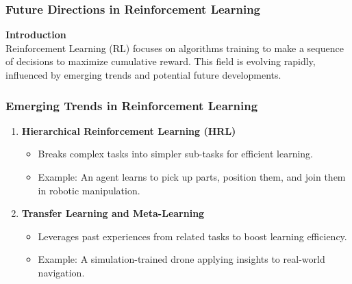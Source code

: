 \documentclass[aspectratio=169]{beamer}
\begin{document}
\begin{frame}[fragile]
    \frametitle{Future Directions in Reinforcement Learning}
    \textbf{Introduction} \\
    Reinforcement Learning (RL) focuses on algorithms training to make a sequence of decisions to maximize cumulative reward. This field is evolving rapidly, influenced by emerging trends and potential future developments.
\end{frame}

\begin{frame}[fragile]
    \frametitle{Emerging Trends in Reinforcement Learning}
    \begin{enumerate}
        \item \textbf{Hierarchical Reinforcement Learning (HRL)}
            \begin{itemize}
                \item Breaks complex tasks into simpler sub-tasks for efficient learning.
                \item Example: An agent learns to pick up parts, position them, and join them in robotic manipulation.
            \end{itemize}
        
        \item \textbf{Transfer Learning and Meta-Learning}
            \begin{itemize}
                \item Leverages past experiences from related tasks to boost learning efficiency.
                \item Example: A simulation-trained drone applying insights to real-world navigation.
            \end{itemize}
    \end{enumerate}
\end{frame}
\end{document}

